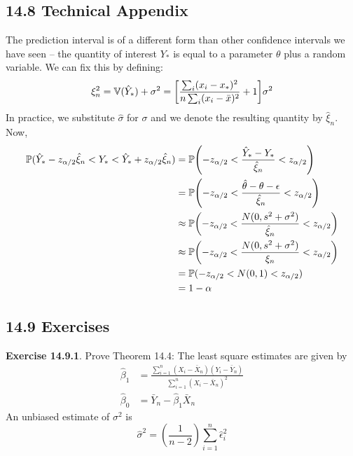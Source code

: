 \subsection*{14.8 Technical Appendix}
The prediction interval is of a different form than other confidence
intervals we have seen -- the quantity of interest \(Y_{*}\) is equal to a
parameter \(\theta\) plus a random variable.
We can fix this by defining:
\[
\xi_{n}^{2} = \VAR(\hat{Y}_{*}) + \sigma^{2} = \left[\frac{\sum_{i} (x_{i} - x_{*})^{2}}{n \sum_{i} (x_{i} - \bar{x})^{2}} + 1\right] \sigma^{2}
\]
In practice, we substitute \(\hat{\sigma}\) for \(\sigma\) and we denote
the resulting quantity by \(\hat{\xi}_{n}\). Now,
\begin{align*}
\PROB(\hat{Y}_{*} - z_{\alpha/2} \hat{\xi}_{n} < Y_{*} < \hat{Y}_{*} + z_{\alpha/2} \hat{\xi}_{n}) &=
\PROB\left(-z_{\alpha/2} < \frac{\hat{Y}_{*} - Y_{*}}{\hat{\xi}_{n}} < z_{\alpha/2} \right)\\
&= \PROB\left(-z_{\alpha/2} < \frac{\hat{\theta} - \theta - \epsilon}{\hat{\xi}_{n}} < z_{\alpha/2} \right) \\
&\approx \PROB\left(-z_{\alpha/2} < \frac{N(0, s^{2} + \sigma^{2})}{\hat{\xi}_{n}} < z_{\alpha/2} \right)  \\
&\approx \PROB\left(-z_{\alpha/2} < \frac{N(0, s^{2} + \sigma^{2})}{\xi_{n}} < z_{\alpha/2} \right)  \\
&= \PROB(-z_{\alpha/2} < N(0, 1) < z_{\alpha/2}) \\
&= 1 - \alpha
\end{align*}

\subsection*{14.9 Exercises}

\textbf{Exercise 14.9.1}. Prove Theorem 14.4:
The least square estimates are given by
\begin{align*}
\hat{\beta}_{1} &= \frac{\sum_{i=1}^{n} (X_{i} - \bar{X}_{n}) (Y_{i} - \bar{Y}_{n})}{\sum_{i=1}^{n} (X_{i} - \bar{X}_{n})^{2}}\\
\hat{\beta}_{0} &= \bar{Y}_{n} - \hat{\beta}_{1} \bar{X}_{n}
\end{align*}
An unbiased estimate of \(\sigma^{2}\) is
\[
\hat{\sigma}^{2} = \left( \frac{1}{n - 2} \right) \sum_{i=1}^{n} \hat{\epsilon}_{i}^{2}
\]

